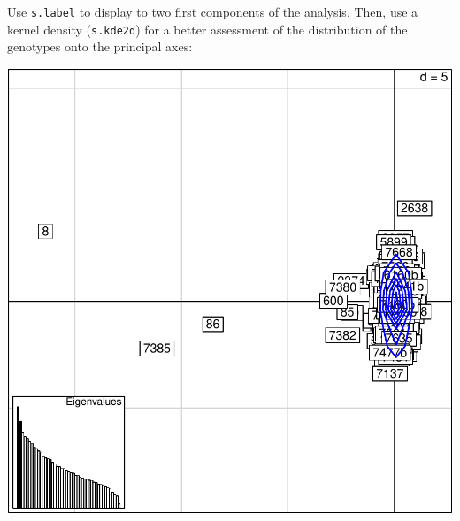 \documentclass{article}
\begin{document}
Use \texttt{s.label} to display to two first components of the analysis.
Then, use a kernel density (\texttt{s.kde2d}) for a better
assessment of the distribution of the genotypes onto the principal axes:
\begin{Schunk}
\end{Schunk}
\includegraphics{figs/spca-029}
\end{document}
